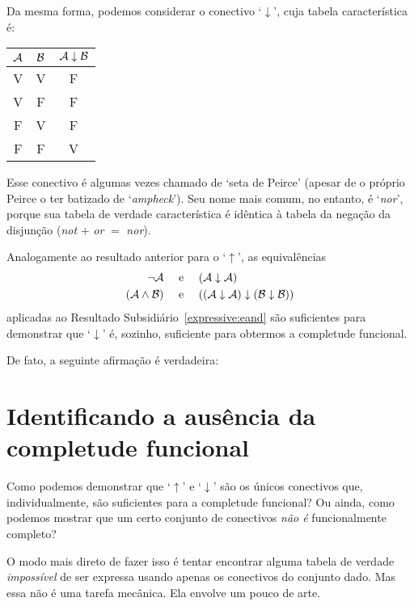 Da mesma forma, podemos considerar o conectivo `$\downarrow$', cuja tabela característica é:
\begin{center}
\begin{tabular}{c c | c}
$\mathcal{A}$ & $\mathcal{B}$ & $\mathcal{A} \mathrel{\downarrow} \mathcal{B}$\\
\hline
 V & V & F \\
 V & F & F  \\
 F & V & F  \\
 F & F & V
\end{tabular}
\end{center}
Esse conectivo é algumas vezes chamado de `seta de Peirce' (apesar de o próprio Peirce o ter batizado de `\emph{ampheck}').
Seu nome mais comum, no entanto, é `\emph{nor}', porque sua tabela de verdade característica é idêntica à tabela  da negação da disjunção (\emph{not} $+$ \emph{or} $=$ \emph{nor}).

Analogamente ao resultado anterior para o `$\uparrow$', as equivalências
		\begin{align*}
			\neg \mathcal{A} &\text{\quad \ e \quad} (\mathcal{A} \downarrow \mathcal{A})\\
			(\mathcal{A} \wedge \mathcal{B}) & \text{\quad \ e \quad} ((\mathcal{A} \downarrow \mathcal{A}) \downarrow (\mathcal{B} \downarrow \mathcal{B}))
		\end{align*}
aplicadas ao Resultado Subsidiário~\ref{expressive:eand} são suficientes para demonstrar que `$\downarrow$' é, sozinho, suficiente para obtermos a completude funcional.

De fato, a seguinte afirmação é verdadeira:        
        

\section{Identificando a ausência da completude funcional}

Como podemos demonstrar que `$\uparrow$' e `$\downarrow$' são os únicos conectivos que, individualmente, são suficientes para a completude funcional? Ou ainda, como podemos mostrar que um certo conjunto de conectivos \emph{não é} funcionalmente completo?

O modo mais direto de fazer isso é tentar encontrar alguma tabela de verdade \emph{impossível} de ser expressa usando apenas os conectivos do conjunto dado.
Mas essa não é uma tarefa mecânica.
Ela envolve um pouco de arte.

